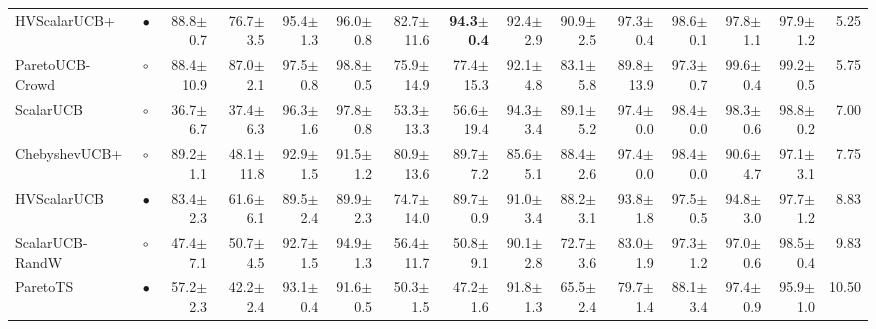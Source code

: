 \begin{tabular}{llrrrrrrrrrrrrr}
HVScalarUCB+ & $\bullet$ & 88.8{\scriptsize$\pm$0.7} & 76.7{\scriptsize$\pm$3.5} & 95.4{\scriptsize$\pm$1.3} & 96.0{\scriptsize$\pm$0.8} & 82.7{\scriptsize$\pm$11.6} & \textbf{94.3{\scriptsize$\pm$0.4}} & 92.4{\scriptsize$\pm$2.9} & 90.9{\scriptsize$\pm$2.5} & 97.3{\scriptsize$\pm$0.4} & 98.6{\scriptsize$\pm$0.1} & 97.8{\scriptsize$\pm$1.1} & 97.9{\scriptsize$\pm$1.2} & 5.25\\
ParetoUCB-Crowd & $\circ$ & 88.4{\scriptsize$\pm$10.9} & 87.0{\scriptsize$\pm$2.1} & 97.5{\scriptsize$\pm$0.8} & 98.8{\scriptsize$\pm$0.5} & 75.9{\scriptsize$\pm$14.9} & 77.4{\scriptsize$\pm$15.3} & 92.1{\scriptsize$\pm$4.8} & 83.1{\scriptsize$\pm$5.8} & 89.8{\scriptsize$\pm$13.9} & 97.3{\scriptsize$\pm$0.7} & 99.6{\scriptsize$\pm$0.4} & 99.2{\scriptsize$\pm$0.5} & 5.75\\
ScalarUCB & $\circ$ & 36.7{\scriptsize$\pm$6.7} & 37.4{\scriptsize$\pm$6.3} & 96.3{\scriptsize$\pm$1.6} & 97.8{\scriptsize$\pm$0.8} & 53.3{\scriptsize$\pm$13.3} & 56.6{\scriptsize$\pm$19.4} & 94.3{\scriptsize$\pm$3.4} & 89.1{\scriptsize$\pm$5.2} & 97.4{\scriptsize$\pm$0.0} & 98.4{\scriptsize$\pm$0.0} & 98.3{\scriptsize$\pm$0.6} & 98.8{\scriptsize$\pm$0.2} & 7.00\\
ChebyshevUCB+ & $\circ$ & 89.2{\scriptsize$\pm$1.1} & 48.1{\scriptsize$\pm$11.8} & 92.9{\scriptsize$\pm$1.5} & 91.5{\scriptsize$\pm$1.2} & 80.9{\scriptsize$\pm$13.6} & 89.7{\scriptsize$\pm$7.2} & 85.6{\scriptsize$\pm$5.1} & 88.4{\scriptsize$\pm$2.6} & 97.4{\scriptsize$\pm$0.0} & 98.4{\scriptsize$\pm$0.0} & 90.6{\scriptsize$\pm$4.7} & 97.1{\scriptsize$\pm$3.1} & 7.75\\
HVScalarUCB & $\bullet$ & 83.4{\scriptsize$\pm$2.3} & 61.6{\scriptsize$\pm$6.1} & 89.5{\scriptsize$\pm$2.4} & 89.9{\scriptsize$\pm$2.3} & 74.7{\scriptsize$\pm$14.0} & 89.7{\scriptsize$\pm$0.9} & 91.0{\scriptsize$\pm$3.4} & 88.2{\scriptsize$\pm$3.1} & 93.8{\scriptsize$\pm$1.8} & 97.5{\scriptsize$\pm$0.5} & 94.8{\scriptsize$\pm$3.0} & 97.7{\scriptsize$\pm$1.2} & 8.83\\
ScalarUCB-RandW & $\circ$ & 47.4{\scriptsize$\pm$7.1} & 50.7{\scriptsize$\pm$4.5} & 92.7{\scriptsize$\pm$1.5} & 94.9{\scriptsize$\pm$1.3} & 56.4{\scriptsize$\pm$11.7} & 50.8{\scriptsize$\pm$9.1} & 90.1{\scriptsize$\pm$2.8} & 72.7{\scriptsize$\pm$3.6} & 83.0{\scriptsize$\pm$1.9} & 97.3{\scriptsize$\pm$1.2} & 97.0{\scriptsize$\pm$0.6} & 98.5{\scriptsize$\pm$0.4} & 9.83\\
ParetoTS & $\bullet$ & 57.2{\scriptsize$\pm$2.3} & 42.2{\scriptsize$\pm$2.4} & 93.1{\scriptsize$\pm$0.4} & 91.6{\scriptsize$\pm$0.5} & 50.3{\scriptsize$\pm$1.5} & 47.2{\scriptsize$\pm$1.6} & 91.8{\scriptsize$\pm$1.3} & 65.5{\scriptsize$\pm$2.4} & 79.7{\scriptsize$\pm$1.4} & 88.1{\scriptsize$\pm$3.4} & 97.4{\scriptsize$\pm$0.9} & 95.9{\scriptsize$\pm$1.0} & 10.50\\

\end{tabular}
